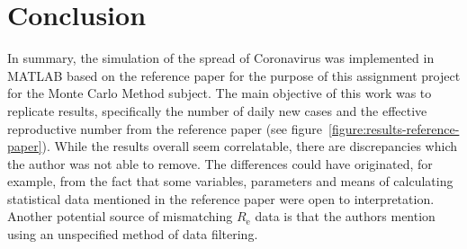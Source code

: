 \documentclass[a4paper]{article}
\begin{document}
\section{Conclusion}\label{section:conclusion}
In summary, the simulation of the spread of Coronavirus was implemented in MATLAB based on the reference paper \cite{Maltezos2021} for the purpose of this assignment project for the Monte Carlo Method subject. The main objective of this work was to replicate results, specifically the number of daily new cases and the effective reproductive number from the reference paper \cite{Maltezos2021} (see figure~\ref{figure:results-reference-paper}). While the results overall seem correlatable, there are discrepancies which the author was not able to remove. The differences could have originated, for example, from the fact that some variables, parameters and means of calculating statistical data mentioned in the reference paper \cite{Maltezos2021} were open to interpretation. Another potential source of mismatching $R_\textrm{e}$ data is that the authors mention using an unspecified method of data filtering.





 
\end{document}
